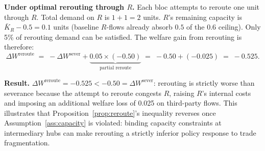 \documentclass[12pt]{article}
\begin{document}
\textbf{Under optimal rerouting through $R$.} Each bloc attempts to reroute one unit through $R$. Total demand on $R$ is $1+1=2$ units. $R$'s remaining capacity is $\bar{K}_R - 0.5 = 0.1$ units (baseline $R$-flows already absorb $0.5$ of the $0.6$ ceiling). Only 5\% of rerouting demand can be satisfied. The welfare gain from rerouting is therefore:
\[
  \Delta W^{\text{reroute}} \;=\; -\Delta W^{\text{sever}} + \underbrace{0.05 \times (-0.50)}_{\text{partial reroute}} \;=\; -0.50 + (-0.025) \;=\; -0.525.
\]

\textbf{Result.} $\Delta W^{\text{reroute}} = -0.525 < -0.50 = \Delta W^{\text{sever}}$: rerouting is strictly worse than severance because the attempt to reroute congests $R$, raising $R$'s internal costs and imposing an additional welfare loss of 0.025 on third-party flows. This illustrates that Proposition~\ref{prop:reroute}'s inequality reverses once Assumption~\ref{ass:capacity} is violated: binding capacity constraints at intermediary hubs can make rerouting a strictly inferior policy response to trade fragmentation.



\end{document}
